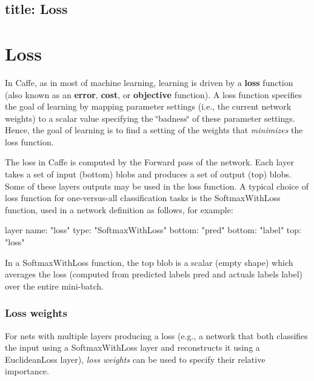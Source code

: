 

 \subsection*{title\+: Loss }

\section*{Loss}

In Caffe, as in most of machine learning, learning is driven by a {\bfseries loss} function (also known as an {\bfseries error}, {\bfseries cost}, or {\bfseries objective} function). A loss function specifies the goal of learning by mapping parameter settings (i.\+e., the current network weights) to a scalar value specifying the \char`\"{}badness\char`\"{} of these parameter settings. Hence, the goal of learning is to find a setting of the weights that {\itshape minimizes} the loss function.

The loss in Caffe is computed by the Forward pass of the network. Each layer takes a set of input ({\ttfamily bottom}) blobs and produces a set of output ({\ttfamily top}) blobs. Some of these layers\textquotesingle{} outputs may be used in the loss function. A typical choice of loss function for one-\/versus-\/all classification tasks is the {\ttfamily Softmax\+With\+Loss} function, used in a network definition as follows, for example\+: \begin{DoxyVerb}layer {
  name: "loss"
  type: "SoftmaxWithLoss"
  bottom: "pred"
  bottom: "label"
  top: "loss"
}
\end{DoxyVerb}


In a {\ttfamily Softmax\+With\+Loss} function, the {\ttfamily top} blob is a scalar (empty shape) which averages the loss (computed from predicted labels {\ttfamily pred} and actuals labels {\ttfamily label}) over the entire mini-\/batch.

\subsubsection*{Loss weights}

For nets with multiple layers producing a loss (e.\+g., a network that both classifies the input using a {\ttfamily Softmax\+With\+Loss} layer and reconstructs it using a {\ttfamily Euclidean\+Loss} layer), {\itshape loss weights} can be used to specify their relative importance.

